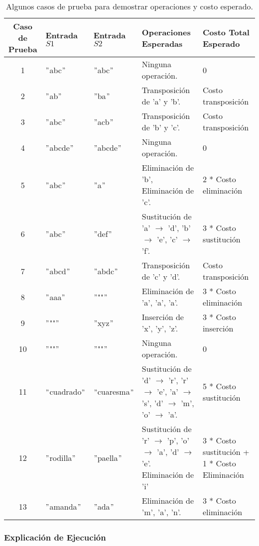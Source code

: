 \begin{table}[!ht]
    \centering
    \footnotesize
    \begin{tabular}{|c|l|l|p{5cm}|p{4cm}|}
    \hline
    \textbf{Caso de Prueba} & \textbf{Entrada \( S1 \)} & \textbf{Entrada \( S2 \)} & \textbf{Operaciones Esperadas} & \textbf{Costo Total Esperado} \\
    \hline
    1 & $"$abc$"$ & $"$abc$"$ & Ninguna operación. & 0 \\
    2 & $"$ab$"$ & $"$ba$"$ & Transposición de 'a' y 'b'. & Costo transposición \\
    3 & $"$abc$"$ & $"$acb$"$ & Transposición de 'b' y 'c'. & Costo transposición \\
    4 & $"$abcde$"$ & $"$abcde$"$ & Ninguna operación. & 0 \\
    5 & $"$abc$"$ & $"$a$"$ & Eliminación de 'b', Eliminación de 'c'. & 2 * Costo eliminación \\
    6 & $"$abc$"$ & $"$def$"$ & Sustitución de 'a' $\rightarrow$ 'd', 'b' $\rightarrow$ 'e', 'c' $\rightarrow$ 'f'. & 3 * Costo sustitución \\
    7 & $"$abcd$"$ & $"$abdc$"$ & Transposición de 'c' y 'd'. & Costo transposición \\
    8 & $"$aaa$"$ & $"$""$"$ & Eliminación de 'a', 'a', 'a'. & 3 * Costo eliminación \\
    9 & $"$""$"$ & $"$xyz$"$ & Inserción de 'x', 'y', 'z'. & 3 * Costo inserción \\
    10 & $"$""$"$ & $"$""$"$ & Ninguna operación. & 0 \\
    11 & $"$cuadrado$"$ & $"$cuaresma$"$ & Sustitución de 'd' $\rightarrow$ 'r', 'r' $\rightarrow$ 'e', 'a' $\rightarrow$ 's', 'd' $\rightarrow$ 'm', 'o' $\rightarrow$ 'a'. & 5 * Costo sustitución \\
    12 & $"$rodilla$"$ & $"$paella$"$ & Sustitución de 'r' $\rightarrow$ 'p', 'o' $\rightarrow$ 'a', 'd' $\rightarrow$ 'e'. Eliminación de 'i' & 3 * Costo sustitución + 1 * Costo Eliminación\\
    13 & $"$amanda$"$ & $"$ada$"$ & Eliminación de 'm', 'a', 'n'. & 3 * Costo eliminación \\
    \hline
    \end{tabular}
    \caption{Algunos casos de prueba para demostrar operaciones y costo esperado.}
\end{table}
    

\subsubsection{Explicación de Ejecución}

